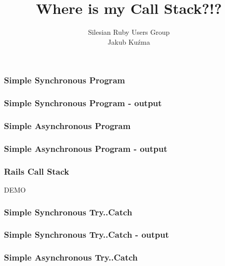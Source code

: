 \documentclass[16pt]{beamer}
\author{Silesian Ruby Users Group\\\footnotesize{Jakub Kuźma}}
\title{Where is my Call Stack?!?}
\begin{document}
\frame{\titlepage}

\begin{frame}[fragile]
  \frametitle{Simple Synchronous Program}
  \begin{footnotesize}
    
  \end{footnotesize}
\end{frame}

\begin{frame}[fragile]
  \frametitle{Simple Synchronous Program - output}
  \begin{scriptsize}
    
  \end{scriptsize}
\end{frame}

\begin{frame}[fragile]
  \frametitle{Simple Asynchronous Program}
  \begin{footnotesize}
    
  \end{footnotesize}
\end{frame}

\begin{frame}[fragile]
  \frametitle{Simple Asynchronous Program - output}
  \begin{scriptsize}
    
  \end{scriptsize}
\end{frame}

\begin{frame}
  \frametitle{Rails Call Stack}
  \begin{center}
    DEMO
  \end{center}
\end{frame}

\begin{frame}[fragile]
  \frametitle{Simple Synchronous Try..Catch}
  \begin{footnotesize}
    
  \end{footnotesize}
\end{frame}

\begin{frame}[fragile]
  \frametitle{Simple Synchronous Try..Catch - output}
  \begin{scriptsize}
    
  \end{scriptsize}
\end{frame}

\begin{frame}[fragile]
  \frametitle{Simple Asynchronous Try..Catch}
  \begin{footnotesize}
    
  \end{footnotesize}
\end{frame}
\end{document}
